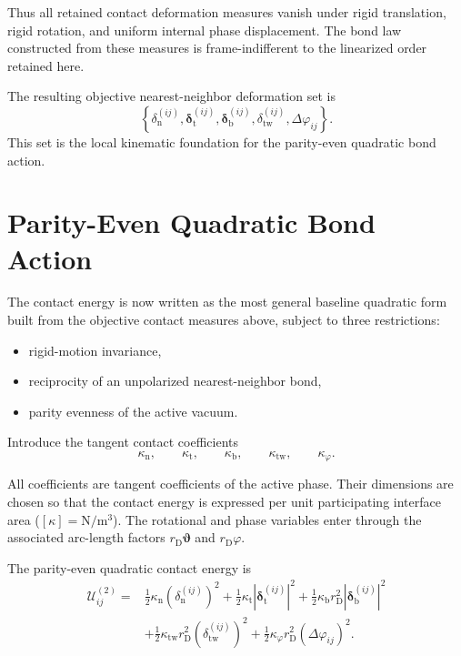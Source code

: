 Thus all retained contact deformation measures vanish under rigid translation, rigid rotation, and uniform internal phase displacement. The bond law constructed from these measures is frame-indifferent to the linearized order retained here.

The resulting objective nearest-neighbor deformation set is
\begin{equation}
    \left\{ \delta_{\mathrm{n}}^{(ij)}, \boldsymbol{\delta}_{\mathrm{t}}^{(ij)}, \boldsymbol{\delta}_{\mathrm{b}}^{(ij)}, \delta_{\mathrm{tw}}^{(ij)}, \Delta\varphi_{ij} \right\}.
\end{equation}
This set is the local kinematic foundation for the parity-even quadratic bond action.

\section{Parity-Even Quadratic Bond Action}

The contact energy is now written as the most general baseline quadratic form built from the objective contact measures above, subject to three restrictions:
\begin{itemize}
    \item rigid-motion invariance,
    \item reciprocity of an unpolarized nearest-neighbor bond,
    \item parity evenness of the active vacuum.
\end{itemize}

Introduce the tangent contact coefficients
\begin{equation}
    \kappa_{\mathrm{n}}, \qquad \kappa_{\mathrm{t}}, \qquad \kappa_{\mathrm{b}}, \qquad \kappa_{\mathrm{tw}}, \qquad \kappa_\varphi.
\end{equation}

All coefficients are tangent coefficients of the active phase. Their dimensions are chosen so that the contact energy is expressed per unit participating interface area ($[\kappa] = \mathrm{N/m^3}$). The rotational and phase variables enter through the associated arc-length factors $r_{\mathrm{D}}\boldsymbol{\vartheta}$ and $r_{\mathrm{D}}\varphi$.

The parity-even quadratic contact energy is
\begin{equation}
\begin{aligned}
    \mathcal{U}_{ij}^{(2)} ={}& \frac{1}{2} \kappa_{\mathrm{n}} (\delta_{\mathrm{n}}^{(ij)})^2 + \frac{1}{2} \kappa_{\mathrm{t}} |\boldsymbol{\delta}_{\mathrm{t}}^{(ij)}|^2 + \frac{1}{2} \kappa_{\mathrm{b}} r_{\mathrm{D}}^2 |\boldsymbol{\delta}_{\mathrm{b}}^{(ij)}|^2 \\
    &+ \frac{1}{2} \kappa_{\mathrm{tw}} r_{\mathrm{D}}^2 (\delta_{\mathrm{tw}}^{(ij)})^2 + \frac{1}{2} \kappa_\varphi r_{\mathrm{D}}^2 (\Delta\varphi_{ij})^2.
\end{aligned}
\end{equation}

